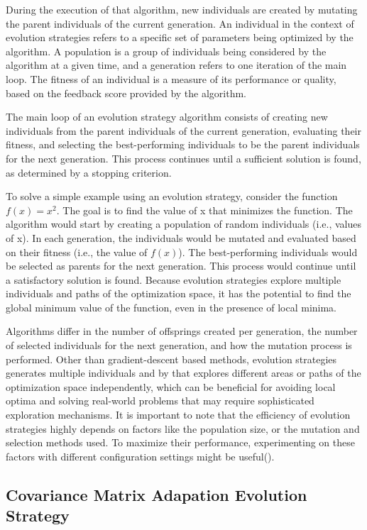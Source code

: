 During the execution of that algorithm, new individuals are created by mutating the parent individuals of the current generation. An individual in the context of evolution strategies refers to a specific set of parameters being optimized by the algorithm. A population is a group of individuals being considered by the algorithm at a given time, and a generation refers to one iteration of the main loop. The fitness of an individual is a measure of its performance or quality, based on the feedback score provided by the algorithm.

The main loop of an evolution strategy algorithm consists of creating new individuals from the parent individuals of the current generation, evaluating their fitness, and selecting the best-performing individuals to be the parent individuals for the next generation. This process continues until a sufficient solution is found, as determined by a stopping criterion.

To solve a simple example using an evolution strategy, consider the function $f(x) = x^2$. The goal is to find the value of x that minimizes the function. The algorithm would start by creating a population of random individuals (i.e., values of x). In each generation, the individuals would be mutated and evaluated based on their fitness (i.e., the value of $f(x)$). The best-performing individuals would be selected as parents for the next generation. This process would continue until a satisfactory solution is found. Because evolution strategies explore multiple individuals and paths of the optimization space, it has the potential to find the global minimum value of the function, even in the presence of local minima.

Algorithms differ in the number of offsprings created per generation, the number of selected individuals for the next generation, and how the mutation process is performed. Other than gradient-descent based methods, evolution strategies generates multiple individuals and by that explores different areas or paths of the optimization space independently, which can be beneficial for avoiding local optima and solving real-world problems that may require sophisticated exploration mechanisms. It is important to note that the efficiency of evolution strategies highly depends on factors like the population size, or the mutation and selection methods used. To maximize their performance, experimenting on these factors with different configuration settings might be useful(\cite{salimans_evolution_2017}).

\subsection{Covariance Matrix Adapation Evolution Strategy}


